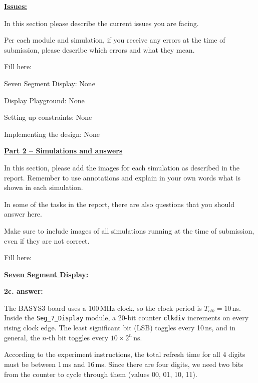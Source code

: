 \documentclass[11pt]{article}
\newcommand{\templatesection}[1]{%
  \vspace{4pt}
  {\fontsize{14pt}{18pt}\selectfont\textbf{\underline{#1}}}
  \vspace{2pt}
}
\newcommand{\templatesubsection}[1]{%
  \textbf{\underline{#1}}
}
\begin{document}
\vspace{12pt}

\templatesubsection{Issues:}

In this section please describe the current issues you are facing.

Per each module and simulation, if you receive any errors at the time of submission, please describe which errors and what they mean.

\vspace{6pt}

Fill here:

Seven Segment Display: None

Display Playground: None

Setting up constraints: None

Implementing the design: None


\newpage
\templatesection{Part 2 -- Simulations and answers}

In this section, please add the images for each simulation as described in the report. Remember to use annotations and explain in your own words what is shown in each simulation.

In some of the tasks in the report, there are also questions that you should answer here.

Make sure to include images of all simulations running at the time of submission, even if they are not correct.

\vspace{12pt}

Fill here:


\templatesubsection{Seven Segment Display:}

\vspace{6pt}

\textbf{2c. answer:}

The BASYS3 board uses a 100\,MHz clock, so the clock period is $T_{clk} = 10$\,ns. Inside the \texttt{Seg\_7\_Display} module, a 20-bit counter \texttt{clkdiv} increments on every rising clock edge. The least significant bit (LSB) toggles every 10\,ns, and in general, the $n$-th bit toggles every $10 \times 2^{n}$\,ns.

According to the experiment instructions, the total refresh time for all 4 digits must be between 1\,ms and 16\,ms. Since there are four digits, we need two bits from the counter to cycle through them (values 00, 01, 10, 11).
\end{document}
